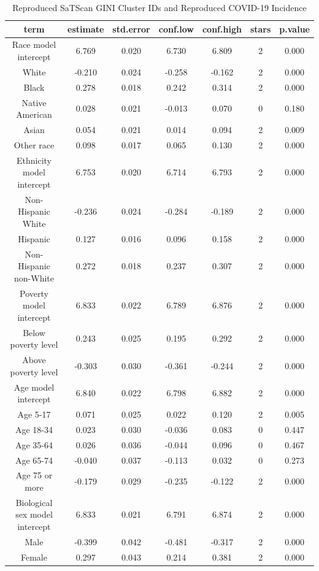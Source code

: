 \documentclass[
]{article}
\begin{document}
\begin{table}

\caption{\label{tab:gee-gini-clusters-reproduced-incidence}Reproduced SaTScan GINI Cluster IDs and Reproduced COVID-19 Incidence}
\centering
\begin{tabular}[t]{c|c|c|c|c|c|c}
\hline
term & estimate & std.error & conf.low & conf.high & stars & p.value\\
\hline
Race model intercept & 6.769 & 0.020 & 6.730 & 6.809 & 2 & 0.000\\
\hline
White & -0.210 & 0.024 & -0.258 & -0.162 & 2 & 0.000\\
\hline
Black & 0.278 & 0.018 & 0.242 & 0.314 & 2 & 0.000\\
\hline
Native American & 0.028 & 0.021 & -0.013 & 0.070 & 0 & 0.180\\
\hline
Asian & 0.054 & 0.021 & 0.014 & 0.094 & 2 & 0.009\\
\hline
Other race & 0.098 & 0.017 & 0.065 & 0.130 & 2 & 0.000\\
\hline
Ethnicity model intercept & 6.753 & 0.020 & 6.714 & 6.793 & 2 & 0.000\\
\hline
Non-Hispanic White & -0.236 & 0.024 & -0.284 & -0.189 & 2 & 0.000\\
\hline
Hispanic & 0.127 & 0.016 & 0.096 & 0.158 & 2 & 0.000\\
\hline
Non-Hispanic non-White & 0.272 & 0.018 & 0.237 & 0.307 & 2 & 0.000\\
\hline
Poverty model intercept & 6.833 & 0.022 & 6.789 & 6.876 & 2 & 0.000\\
\hline
Below poverty level & 0.243 & 0.025 & 0.195 & 0.292 & 2 & 0.000\\
\hline
Above poverty level & -0.303 & 0.030 & -0.361 & -0.244 & 2 & 0.000\\
\hline
Age model intercept & 6.840 & 0.022 & 6.798 & 6.882 & 2 & 0.000\\
\hline
Age 5-17 & 0.071 & 0.025 & 0.022 & 0.120 & 2 & 0.005\\
\hline
Age 18-34 & 0.023 & 0.030 & -0.036 & 0.083 & 0 & 0.447\\
\hline
Age 35-64 & 0.026 & 0.036 & -0.044 & 0.096 & 0 & 0.467\\
\hline
Age 65-74 & -0.040 & 0.037 & -0.113 & 0.032 & 0 & 0.273\\
\hline
Age 75 or more & -0.179 & 0.029 & -0.235 & -0.122 & 2 & 0.000\\
\hline
Biological sex model intercept & 6.833 & 0.021 & 6.791 & 6.874 & 2 & 0.000\\
\hline
Male & -0.399 & 0.042 & -0.481 & -0.317 & 2 & 0.000\\
\hline
Female & 0.297 & 0.043 & 0.214 & 0.381 & 2 & 0.000\\
\hline
\end{tabular}
\end{table}
\end{document}
